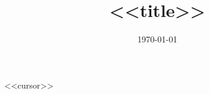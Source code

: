 \documentclass{article}
\title{<<title>>}
\author{\documentauthor}
\date{\today}
\begin{document}
\maketitle
<<cursor>>
\end{document}
